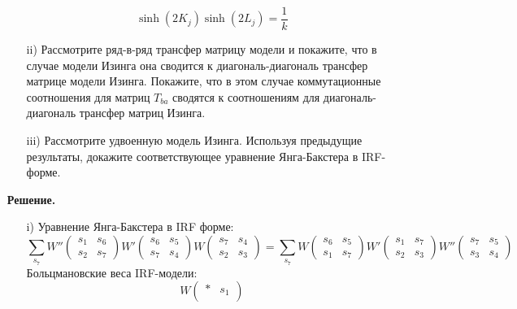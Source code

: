 \documentclass[12pt]{article}
\theoremstyle{definition}
\begin{document}
\begin{enumerate}
\begin{itemize}
\begin{equation}
            \sinh(2K_j)\sinh(2L_j)=\frac{1}{k}
        \end{equation}
        \item[ii)] Рассмотрите ряд-в-ряд трансфер матрицу модели и покажите, что в случае модели Изинга она сводится к диагональ-диагональ трансфер матрице модели Изинга. Покажите, что в этом случае коммутационные соотношения для матриц $T_{ba}$ сводятся к соотношениям для диагональ-диагональ трансфер матриц Изинга.
        \item[iii)] Рассмотрите удвоенную модель Изинга. Используя предыдущие результаты, докажите соответствующее уравнение Янга-Бакстера в IRF-форме.
    \end{itemize}
    \textbf{Решение.}
    \begin{itemize}
        \item[i)] Уравнение Янга-Бакстера в IRF форме:
        \begin{equation*}
            \sum\limits_{s_7}W''\begin{pmatrix}
                s_1 & s_6\\
                s_2 & s_7
            \end{pmatrix}W'\begin{pmatrix}
                s_6 & s_5\\
                s_7 & s_4
            \end{pmatrix}W\begin{pmatrix}
                s_7 & s_4\\
                s_2 & s_3
            \end{pmatrix}=\sum\limits_{s_7}W\begin{pmatrix}
                s_6 & s_5\\
                s_1 & s_7
            \end{pmatrix}W'\begin{pmatrix}
                s_1 & s_7\\
                s_2 & s_3
            \end{pmatrix}W''\begin{pmatrix}
                s_7 & s_5\\
                s_3 & s_4
            \end{pmatrix}
        \end{equation*}
        Больцмановские веса IRF-модели:
        \begin{equation}
            W\begin{pmatrix}
                * & s_1\\

\end{pmatrix}
\end{equation}
\end{itemize}
\end{enumerate}
\end{document}
